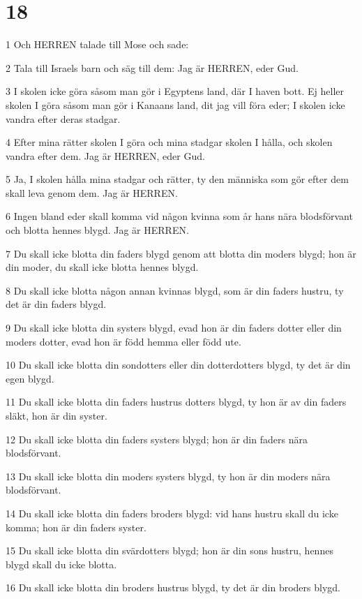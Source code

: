 \chapter{18}

\par 1 Och HERREN talade till Mose och sade:
\par 2 Tala till Israels barn och säg till dem: Jag är HERREN, eder Gud.
\par 3 I skolen icke göra såsom man gör i Egyptens land, där I haven bott. Ej heller skolen I göra såsom man gör i Kanaans land, dit jag vill föra eder; I skolen icke vandra efter deras stadgar.
\par 4 Efter mina rätter skolen I göra och mina stadgar skolen I hålla, och skolen vandra efter dem. Jag är HERREN, eder Gud.
\par 5 Ja, I skolen hålla mina stadgar och rätter, ty den människa som gör efter dem skall leva genom dem. Jag är HERREN.
\par 6 Ingen bland eder skall komma vid någon kvinna som år hans nära blodsförvant och blotta hennes blygd. Jag är HERREN.
\par 7 Du skall icke blotta din faders blygd genom att blotta din moders blygd; hon är din moder, du skall icke blotta hennes blygd.
\par 8 Du skall icke blotta någon annan kvinnas blygd, som är din faders hustru, ty det är din faders blygd.
\par 9 Du skall icke blotta din systers blygd, evad hon är din faders dotter eller din moders dotter, evad hon är född hemma eller född ute.
\par 10 Du skall icke blotta din sondotters eller din dotterdotters blygd, ty det är din egen blygd.
\par 11 Du skall icke blotta din faders hustrus dotters blygd, ty hon är av din faders släkt, hon är din syster.
\par 12 Du skall icke blotta din faders systers blygd; hon är din faders nära blodsförvant.
\par 13 Du skall icke blotta din moders systers blygd, ty hon är din moders nära blodsförvant.
\par 14 Du skall icke blotta din faders broders blygd: vid hans hustru skall du icke komma; hon är din faders syster.
\par 15 Du skall icke blotta din svärdotters blygd; hon är din sons hustru, hennes blygd skall du icke blotta.
\par 16 Du skall icke blotta din broders hustrus blygd, ty det är din broders blygd.

